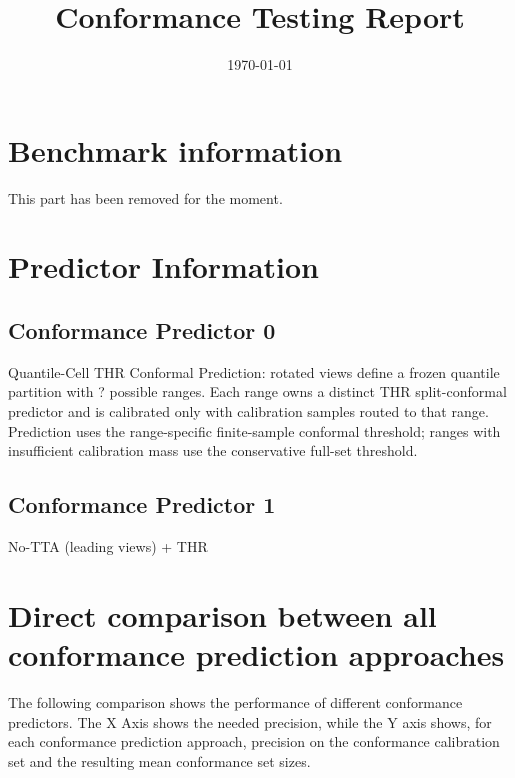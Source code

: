 \documentclass[parskip=half]{scrartcl}
\title{Conformance Testing Report}
\author{\relax}\date{\today}
\begin{document}
 \maketitle
        \section{Benchmark information}This part has been removed for the moment.\section{{Predictor Information}}\subsection{Conformance Predictor 0 }Quantile-Cell THR Conformal Prediction: rotated views define a frozen quantile partition with ? possible ranges. Each range owns a distinct THR split-conformal predictor and is calibrated only with calibration samples routed to that range. Prediction uses the range-specific finite-sample conformal threshold; ranges with insufficient calibration mass use the conservative full-set threshold.\subsection{Conformance Predictor 1 }No-TTA (leading views) + THR\section{Direct comparison between all conformance prediction approaches}
The following comparison shows the performance of different conformance predictors. The X Axis shows the needed precision, while the Y axis shows, for each conformance prediction approach, precision on the conformance calibration set and the resulting mean conformance set sizes.
\end{document}
